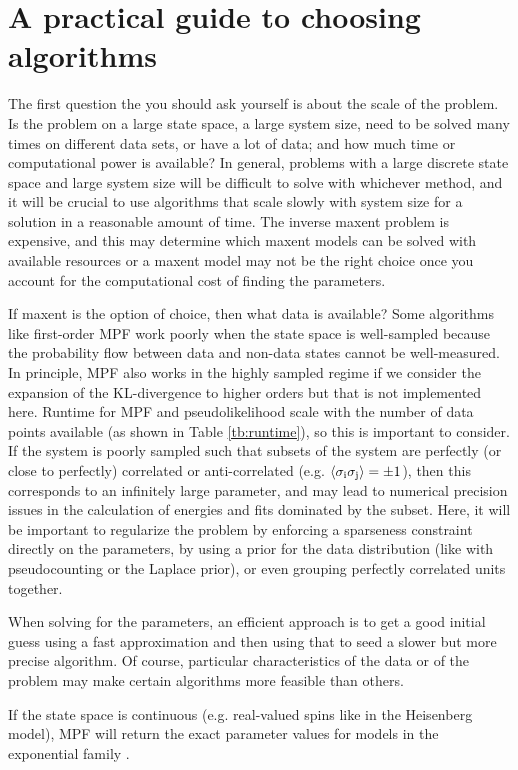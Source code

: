 \documentclass[aps,prl,twocolumn]{revtex4-1}
\begin{document}
\section{A practical guide to choosing algorithms}
The first question the you should ask yourself is about the scale of the problem. Is the problem on a large state space, a large system size, need to be solved many times on different data sets, or have a lot of data; and how much time or computational power is available? In general, problems with a large discrete state space and large system size will be difficult to solve with whichever method, and it will be crucial to use algorithms that scale slowly with system size for a solution in a reasonable amount of time. The inverse maxent problem is expensive, and this may determine which maxent models can be solved with available resources or a maxent model may not be the right choice once you account for the computational cost of finding the parameters.

If maxent is the option of choice, then what data is available? Some algorithms like first-order MPF work poorly when the state space is well-sampled because the probability flow between data and non-data states cannot be well-measured. In principle, MPF also works in the highly sampled regime if we consider the expansion of the KL-divergence to higher orders but that is not implemented here. Runtime for MPF and pseudolikelihood scale with the number of data points available (as shown in Table \ref{tb:runtime}), so this is important to consider.
If the system is poorly sampled such that subsets of the system are perfectly (or close to perfectly) correlated or anti-correlated (e.g. $\left<\sigma_{\rm i}\sigma_{\rm j}\right>=\pm1$), then this corresponds to an infinitely large parameter, and may lead to numerical precision issues in the calculation of energies and fits dominated by the subset. Here, it will be important to regularize the problem by enforcing a sparseness constraint directly on the parameters, by using a prior for the data distribution (like with pseudocounting or the Laplace prior), or even grouping perfectly correlated units together.

When solving for the parameters, an efficient approach is to get a good initial guess using a fast approximation and then using that to seed a slower but more precise algorithm. Of course, particular characteristics of the data or of the problem may make certain algorithms more feasible than others.

If the state space is continuous (e.g. real-valued spins like in the Heisenberg model), MPF will return the exact parameter values for models in the exponential family \cite{SohlDickstein:2011im}.
\end{document}
